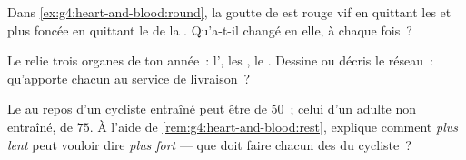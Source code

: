 \begin{exercise}[$\star\star$]\label{exo:g4:heart-and-blood:9}
Dans \cref{ex:g4:heart-and-blood:round}, la goutte de  est rouge
vif en quittant les  et plus foncée en quittant le  de
la . Qu'a-t-il changé en elle, à chaque fois~?
\end{exercise}

\begin{exercise}[$\star\star$]\label{exo:g4:heart-and-blood:10}
Le  relie trois organes de ton année~: l', les
, le . Dessine ou décris le réseau~: qu'apporte chacun au
service de livraison~?
\end{exercise}

\begin{exercise}[$\star\star\star$]\label{exo:g4:heart-and-blood:11}
Le  au repos d'un cycliste entraîné peut être de $50$~; celui
d'un adulte non entraîné, de $75$. À l'aide de
\cref{rem:g4:heart-and-blood:rest}, explique comment \emph{plus lent}
peut vouloir dire \emph{plus fort} --- que doit faire chacun des
 du cycliste~?
\end{exercise}
